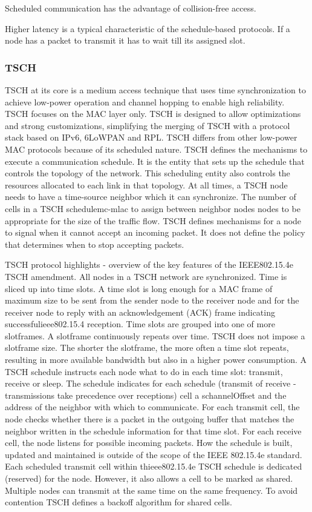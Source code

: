 Scheduled communication has the advantage of collision-free access.

Higher latency is a typical characteristic of the schedule-based protocols. If a node has a packet to transmit it has to wait till its assigned slot.

\subsubsection{TSCH}
TSCH at its core is a medium access technique that uses time synchronization to achieve low-power operation and channel hopping to enable high reliability. TSCH focuses on the MAC layer only. TSCH is designed to allow optimizations and strong customizations, simplifying the merging of TSCH with a protocol stack based on IPv6, 6LoWPAN and RPL. TSCH differs from other low-power MAC protocols because of its scheduled nature. TSCH defines the mechanisms to execute a communication schedule. It is the entity that sets up the schedule that controls the topology of the network. This scheduling entity also controls the resources allocated to each link in that topology. At all times, a TSCH node needs to have a time-source neighbor which it can synchronize. The number of cells in a TSCH schedulemc-mlac  to assign between neighbor nodes nodes to be appropriate for the size of the traffic flow. TSCH defines mechanisms for a node to signal when it cannot accept an incoming packet. It does not define the policy that determines when to stop accepting packets. 

TSCH protocol highlights - overview of the key features of the IEEE802.15.4e TSCH amendment. All nodes in a TSCH network are synchronized. Time is sliced up into time slots. A time slot is long enough for a MAC frame of maximum size to be sent from the sender node to the receiver node and for the receiver node to reply with an acknowledgement (ACK) frame indicating successfulieee802.15.4 reception. Time slots are grouped into one of more slotframes. A slotframe continuously repeats over time. TSCH does not impose a slotframe size. The shorter the slotframe, the more often a time slot repeats, resulting in more available bandwidth but also in a higher power consumption. A TSCH schedule instructs each node what to do in each time slot: transmit, receive or sleep. The schedule indicates for each schedule (transmit of receive - transmissions take precedence over receptions) cell a schannelOffset and the address of the neighbor with which to communicate. For each transmit cell, the node checks whether there is a packet in the outgoing buffer that matches the neighbor written in the schedule information for that time slot. For each receive cell, the node listens for possible incoming packets. How the schedule is built, updated and maintained is outside of the scope of the IEEE 802.15.4e standard. Each scheduled transmit cell within thieee802.15.4e TSCH schedule is dedicated (reserved) for the node. However, it also allows a cell to be marked as shared. Multiple nodes can transmit at the same time on the same frequency. To avoid contention TSCH defines a backoff algorithm for shared cells. 

